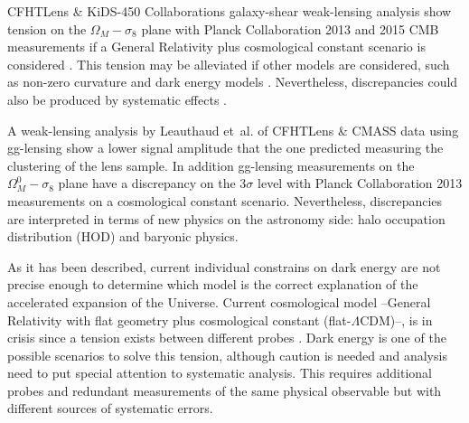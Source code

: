 CFHTLens \& KiDS-450 Collaborations galaxy-shear weak-lensing analysis show tension on the $\Omega_M-\sigma_8$ plane with Planck Collaboration 2013 \cite{2014A&A...571A..16P} and 2015 CMB measurements if a General Relativity plus cosmological constant scenario is considered \cite{2013MNRAS.430.2200K,2017arXiv170303383H}. This tension may be alleviated if other models are considered, such as non-zero curvature and dark energy models \cite{2016arXiv161004606J}. Nevertheless, discrepancies could also be produced by systematic effects \cite{2015PhRvD..92b3003D,2017MNRAS.465.2033J}.
\newline

A weak-lensing analysis by Leauthaud et~al. \cite{2017MNRAS.467.3024L} of CFHTLens \& CMASS data using gg-lensing show a lower signal amplitude that the one predicted measuring the clustering of the lens sample. In addition gg-lensing measurements on the $\Omega_M^0-\sigma_8$ plane have a discrepancy on the $3\sigma$ level with Planck Collaboration 2013 measurements on a cosmological constant scenario. Nevertheless, discrepancies are interpreted in terms of new physics on the astronomy side: halo occupation distribution (HOD) and baryonic physics.
\newline

As it has been described, current individual constrains on dark energy are not precise enough to determine which model is the correct explanation of the accelerated expansion of the Universe. Current cosmological model --General Relativity with flat geometry plus cosmological constant (flat-$\Lambda$CDM)--, is in crisis since a tension exists between different probes \cite{2016PDU....12...56B}. Dark energy is one of the possible scenarios to solve this tension, although caution is needed and analysis need to put special attention to systematic analysis. This requires additional probes and redundant measurements of the same physical observable but with different sources of systematic errors.


